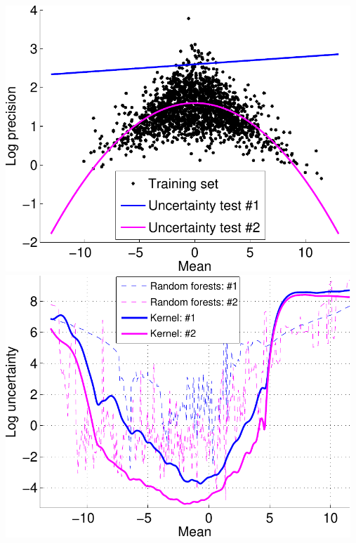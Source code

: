 \documentclass[25pt, a0paper, portrait, margin=0mm, innermargin=10mm,
     blockverticalspace=7mm, colspace=8mm, subcolspace=8mm]{tikzposter} %
\newcommand{\factor}{f}				%
\newcommand{\msg}[2]{m_{#1 \rightarrow #2}}			%
\begin{document}
\begin{columns}
{\begin{itemize}
\begin{tikzfigure}
\centering
  \includegraphics[width=13cm]{uncertainty/logistic_uncertainty_test-crop}
  \hspace{3cm}
      \includegraphics[width=13cm]{uncertainty/logistic_uncertainty_all-crop}


\end{tikzfigure}
\end{itemize}}
\end{columns}
\end{document}
